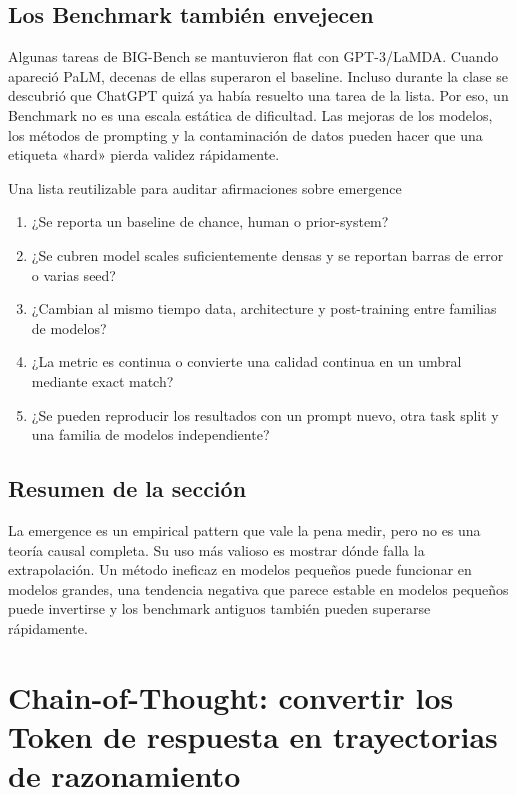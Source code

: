 \documentclass[a4paper]{article}
\begin{document}
\subsection{Los Benchmark también envejecen}

Algunas tareas de BIG-Bench se mantuvieron flat con GPT-3/LaMDA. Cuando apareció PaLM, decenas de ellas superaron el baseline. Incluso durante la clase se descubrió que ChatGPT quizá ya había resuelto una tarea de la lista. Por eso, un Benchmark no es una escala estática de dificultad. Las mejoras de los modelos, los métodos de prompting y la contaminación de datos pueden hacer que una etiqueta «hard» pierda validez rápidamente.

\begin{importantbox}{Una lista reutilizable para auditar afirmaciones sobre emergence}
\begin{enumerate}
  \item ¿Se reporta un baseline de chance, human o prior-system?
  \item ¿Se cubren model scales suficientemente densas y se reportan barras de error o varias seed?
  \item ¿Cambian al mismo tiempo data, architecture y post-training entre familias de modelos?
  \item ¿La metric es continua o convierte una calidad continua en un umbral mediante exact match?
  \item ¿Se pueden reproducir los resultados con un prompt nuevo, otra task split y una familia de modelos independiente?
\end{enumerate}
\end{importantbox}

\subsection{Resumen de la sección}

La emergence es un empirical pattern que vale la pena medir, pero no es una teoría causal completa. Su uso más valioso es mostrar dónde falla la extrapolación. Un método ineficaz en modelos pequeños puede funcionar en modelos grandes, una tendencia negativa que parece estable en modelos pequeños puede invertirse y los benchmark antiguos también pueden superarse rápidamente.
\section{Chain-of-Thought: convertir los Token de respuesta en trayectorias de razonamiento}
\end{document}
